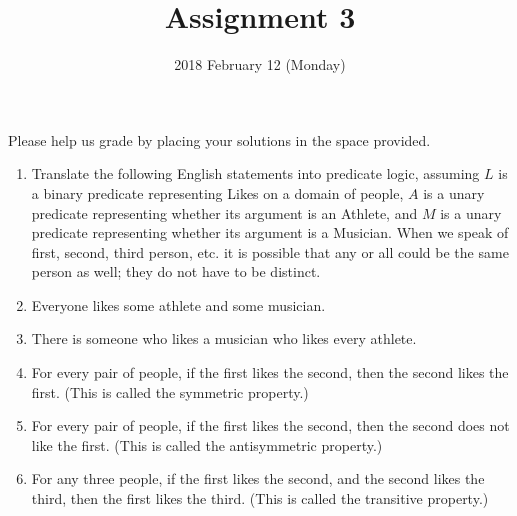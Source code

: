\documentclass{cs81-homework}
\title{Assignment 3}
\author{}
\date{2018 February 12 (Monday)}
\begin{document}
\begin{introduction}
  \theintroduction

  Please help us grade by placing your solutions in the space provided.
\end{introduction}

\begin{enumerate}
\item[] Translate the following English statements into predicate logic,
  assuming \(L\) is a binary predicate representing Likes on a domain of people,
  \(A\) is a unary predicate representing whether its argument is an Athlete,
  and \(M\) is a unary predicate representing whether its argument is a
  Musician.  When we speak of first, second, third person, etc. it is possible
  that any or all could be the same person as well; they do not have to be
  distinct.
  
\item {} Everyone likes some athlete and some musician.

  \begin{solution}
  \end{solution}

\item {} There is someone who likes a musician who likes every athlete.

  \begin{solution}
  \end{solution}

\item {} For every pair of people, if the first likes the second, then the
  second likes the first. (This is called the symmetric property.)

  \begin{solution}
  \end{solution}

\item {} For every pair of people, if the first likes the second, then the
  second does not like the first. (This is called the antisymmetric property.)

  \begin{solution}
  \end{solution}

\item {} For any three people, if the first likes the second, and the
  second likes the third, then the first likes the third. (This is called the
  transitive property.)

  \begin{solution}
  \end{solution}


\end{enumerate}
\end{document}
